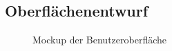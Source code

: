 \subsection{Oberflächenentwurf}
\label{app:Entwuerfe}
\begin{figure}[htb]
\centering
{}
\caption{Mockup der Benutzeroberfläche}
\end{figure}


